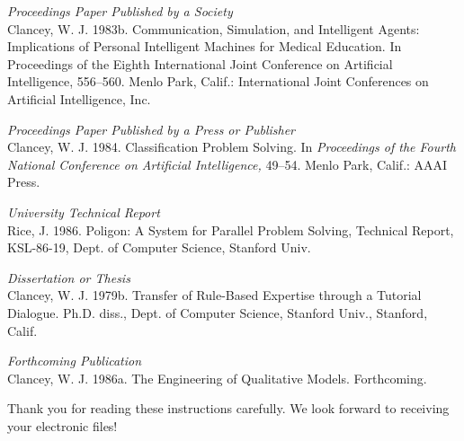 \documentclass[letterpaper]{article}
\begin{document}
\smallskip \noindent \textit{Proceedings Paper Published by a Society}\\
Clancey, W. J. 1983b. Communication, Simulation, and Intelligent Agents: Implications of Personal Intelligent Machines for Medical Education. In Proceedings of the Eighth International Joint Conference on Artificial Intelligence, 556--560. Menlo Park, Calif.: International Joint Conferences on Artificial Intelligence, Inc.

\smallskip \noindent \textit{Proceedings Paper Published by a Press or Publisher}\\
Clancey, W. J. 1984. Classification Problem Solving. In \textit{Proceedings of the Fourth National Conference on Artificial Intelligence,} 49--54. Menlo Park, Calif.: AAAI Press. 

\smallskip \noindent \textit{University Technical Report}\\
Rice, J. 1986. Poligon: A System for Parallel Problem Solving, Technical Report, KSL-86-19, Dept. of Computer Science, Stanford Univ. 

\smallskip \noindent \textit{Dissertation or Thesis}\\
Clancey, W. J. 1979b. Transfer of Rule-Based Expertise through a Tutorial Dialogue. Ph.D. diss., Dept. of Computer Science, Stanford Univ., Stanford, Calif.

\smallskip \noindent \textit{Forthcoming Publication}\\
Clancey, W. J. 1986a. The Engineering of Qualitative Models. Forthcoming.

\bigskip
\noindent Thank you for reading these instructions carefully. We look forward to receiving your electronic files!
\end{document}
